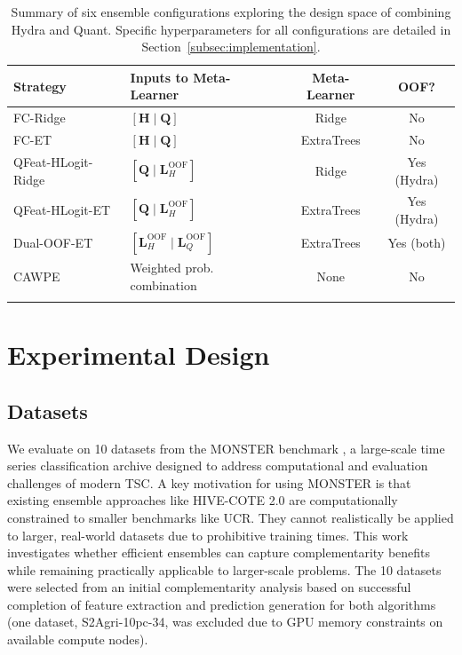 \documentclass[pdflatex,sn-basic]{sn-jnl}           %
\theoremstyle{thmstyleone}%
\theoremstyle{thmstyletwo}%
\theoremstyle{thmstylethree}%
\begin{document}
\begin{table}[h]
\centering
\caption{Summary of six ensemble configurations exploring the design space of combining Hydra and Quant. Specific hyperparameters for all configurations are detailed in Section~\ref{subsec:implementation}.}\label{tab:ensemble_summary}
\small
\begin{tabular}{llcc}
\toprule
\textbf{Strategy} & \textbf{Inputs to Meta-Learner} & \textbf{Meta-Learner} & \textbf{OOF?} \\
\midrule
FC-Ridge & $[\mathbf{H} \mid \mathbf{Q}]$ & Ridge & No \\
FC-ET & $[\mathbf{H} \mid \mathbf{Q}]$ & ExtraTrees & No \\
QFeat-HLogit-Ridge & $[\mathbf{Q} \mid \mathbf{L}_H^{\text{OOF}}]$ & Ridge & Yes (Hydra) \\
QFeat-HLogit-ET & $[\mathbf{Q} \mid \mathbf{L}_H^{\text{OOF}}]$ & ExtraTrees & Yes (Hydra) \\
Dual-OOF-ET & $[\mathbf{L}_H^{\text{OOF}} \mid \mathbf{L}_Q^{\text{OOF}}]$ & ExtraTrees & Yes (both) \\
CAWPE & Weighted prob. combination & None & No \\
\botrule
\end{tabular}
\end{table}

\clearpage

\section{Experimental Design}\label{sec4}

\subsection{Datasets}

We evaluate on 10 datasets from the MONSTER benchmark \citep{monster}, a large-scale time series classification archive designed to address computational and evaluation challenges of modern TSC. A key motivation for using MONSTER is that existing ensemble approaches like HIVE-COTE 2.0 are computationally constrained to smaller benchmarks like UCR. They cannot realistically be applied to larger, real-world datasets due to prohibitive training times. This work investigates whether efficient ensembles can capture complementarity benefits while remaining practically applicable to larger-scale problems. The 10 datasets were selected from an initial complementarity analysis based on successful completion of feature extraction and prediction generation for both algorithms (one dataset, S2Agri-10pc-34, was excluded due to GPU memory constraints on available compute nodes).
\end{document}
